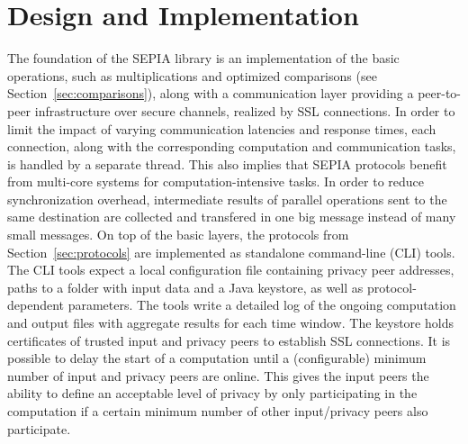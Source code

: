 \documentclass[letterpaper,11pt,onecolumn,titlepage]{article}
\begin{document}
\section{Design and Implementation}
\label{sec:design}
\lstset{language=Java,numbers=none,frame=single,basicstyle=\ttfamily\tiny,breaklines,tabsize=2,showstringspaces=false}






The foundation of the SEPIA library is an implementation of the basic operations, such as multiplications and optimized comparisons 
(see Section~\ref{sec:comparisons}), along
with a communication layer providing a peer-to-peer infrastructure over secure channels, realized by
SSL connections.
In order to limit the impact of varying communication latencies and response
times, each connection, along with the corresponding computation and communication tasks, is
handled by a separate thread. This also implies that SEPIA protocols benefit from multi-core systems for computation-intensive tasks.
In order to reduce synchronization overhead, intermediate results of parallel operations sent to the same destination are collected and transfered in one big message instead of many small messages.
On top of the basic layers, the protocols from Section~\ref{sec:protocols} are implemented as standalone command-line (CLI) tools. 
The CLI tools expect a local configuration file containing privacy peer addresses, paths to a folder with input data and a Java keystore, as well as protocol-dependent parameters. 
The tools write a detailed log of the ongoing computation and output files with aggregate results for each time window.
The keystore holds certificates of trusted input and privacy peers to establish SSL connections.
It is possible to delay the start of a computation until a (configurable) minimum number of input and privacy peers are online. 
This gives the input peers the ability to define an acceptable level of privacy by 
only participating in the computation if a certain minimum number of other input/privacy peers also participate.
\end{document}
